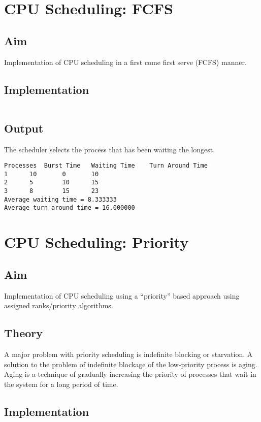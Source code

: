 \section{CPU Scheduling: FCFS}
\label{sec:cpu-scheduling}

\subsection{Aim}
Implementation of CPU scheduling in a first come first serve (FCFS) manner.

\subsection{Implementation}

\inputminted[fontsize=\footnotesize,autogobble]{c}{code/fcfs.c}

\subsection{Output}
The scheduler selects the process that has been waiting the longest.
\begin{lstlisting}[style=output]
Processes  Burst Time   Waiting Time    Turn Around Time
1	   10		0		10
2	   5		10		15
3	   8		15		23
Average waiting time = 8.333333
Average turn around time = 16.000000
\end{lstlisting}

\section{CPU Scheduling: Priority}
\label{sec:cpu-scheduling-priority}

\subsection{Aim}
Implementation of CPU scheduling using a ``priority'' based approach using assigned ranks/priority algorithms.

\subsection{Theory}
A major problem with priority scheduling is indefinite blocking or starvation. A solution to the problem of indefinite blockage of the low-priority process is aging. Aging is a technique of gradually increasing the priority of processes that wait in the system for a long period of time.

\subsection{Implementation}


